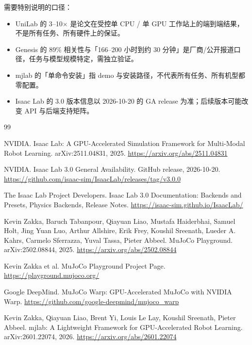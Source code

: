 \documentclass[UTF8, 11pt, a4paper, fontset=windows]{ctexart}
\begin{document}
需要特别说明的口径：

\begin{itemize}
  \item UniLab 的 3--10× 是论文在受控单 CPU / 单 GPU 工作站上的端到端结果，不是所有任务、所有硬件上的保证。
  \item Genesis 的 89\% 相关性与「166--200 小时到约 30 分钟」是厂商/公开报道口径，任务与模型规模特定，需独立验证。
  \item mjlab 的「单命令安装」指 demo 与安装路径，不代表所有任务、所有机型都零配置。
  \item Isaac Lab 的 3.0 版本信息以 2026-10-20 的 GA release 为准；后续版本可能改变 API 与后端支持矩阵。
\end{itemize}

\begin{thebibliography}{99}
\small
\raggedright

NVIDIA.
\newblock Isaac Lab: A GPU-Accelerated Simulation Framework for Multi-Modal Robot Learning.
\newblock arXiv:2511.04831, 2025.
\newblock \url{https://arxiv.org/abs/2511.04831}

NVIDIA.
\newblock Isaac Lab 3.0 General Availability.
\newblock GitHub release, 2026-10-20.
\newblock \url{https://github.com/isaac-sim/IsaacLab/releases/tag/v3.0.0}

The Isaac Lab Project Developers.
\newblock Isaac Lab 3.0 Documentation: Backends and Presets, Physics Backends, Release Notes.
\newblock \url{https://isaac-sim.github.io/IsaacLab/}

Kevin Zakka, Baruch Tabanpour, Qiayuan Liao, Mustafa Haiderbhai, Samuel Holt, Jing Yuan Luo,
Arthur Allshire, Erik Frey, Koushil Sreenath, Lueder A. Kahrs, Carmelo Sferrazza, Yuval Tassa, Pieter Abbeel.
\newblock MuJoCo Playground.
\newblock arXiv:2502.08844, 2025.
\newblock \url{https://arxiv.org/abs/2502.08844}

Kevin Zakka et al.
\newblock MuJoCo Playground Project Page.
\newblock \url{https://playground.mujoco.org/}

Google DeepMind.
\newblock MuJoCo Warp: GPU-Accelerated MuJoCo with NVIDIA Warp.
\newblock \url{https://github.com/google-deepmind/mujoco_warp}

Kevin Zakka, Qiayuan Liao, Brent Yi, Louis Le Lay, Koushil Sreenath, Pieter Abbeel.
\newblock mjlab: A Lightweight Framework for GPU-Accelerated Robot Learning.
\newblock arXiv:2601.22074, 2026.
\newblock \url{https://arxiv.org/abs/2601.22074}


\end{thebibliography}
\end{document}
